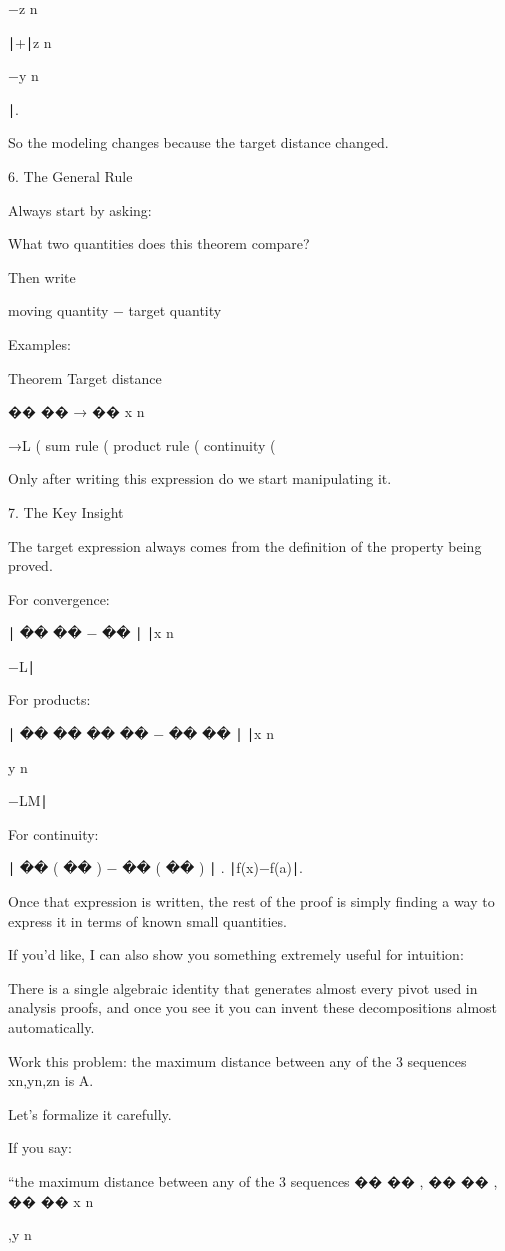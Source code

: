 −z
n
	​

∣+∣z
n
	​

−y
n
	​

∣.

So the modeling changes because the target distance changed.

6. The General Rule

Always start by asking:

What two quantities does this theorem compare?

Then write

moving quantity − target quantity

Examples:

Theorem	Target distance

��
��
→
��
x
n
	​

→L	(
sum rule	(
product rule	(
continuity	(

Only after writing this expression do we start manipulating it.

7. The Key Insight

The target expression always comes from the definition of the property being proved.

For convergence:

∣
��
��
−
��
∣
∣x
n
	​

−L∣

For products:

∣
��
��
��
��
−
��
��
∣
∣x
n
	​

y
n
	​

−LM∣

For continuity:

∣
��
(
��
)
−
��
(
��
)
∣
.
∣f(x)−f(a)∣.

Once that expression is written, the rest of the proof is simply finding a way to express it in terms of known small quantities.

If you'd like, I can also show you something extremely useful for intuition:

There is a single algebraic identity that generates almost every pivot used in analysis proofs, and once you see it you can invent these decompositions almost automatically.


Work this problem: the maximum distance between any of the 3 sequences xn,yn,zn is A.

Let’s formalize it carefully.

If you say:

“the maximum distance between any of the 3 sequences 
��
��
,
��
��
,
��
��
x
n
	​

,y
n
	​

